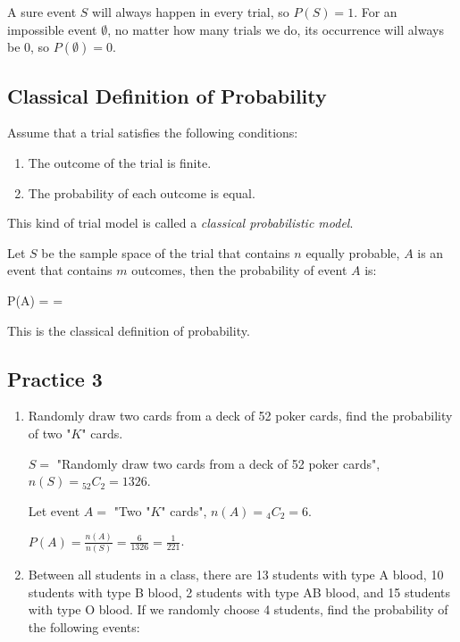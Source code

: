 \documentclass{report}
\newcommand\comb[2][^n]{{}_{#1}C_{#2}}
\begin{document}
\begin{multicols}{2}
  A sure event $S$ will always happen in every trial, so $P(S) = 1$. For an
  impossible event $\emptyset$, no matter how many trials we do, its occurrence
  will always be 0, so $P(\emptyset) = 0$.

  \subsection*{Classical Definition of Probability}

  Assume that a trial satisfies the following conditions:

  \begin{enumerate}
    \item The outcome of the trial is finite.
    \item The probability of each outcome is equal.
  \end{enumerate}

  This kind of trial model is called a \emph{classical probabilistic model}.

  Let $S$ be the sample space of the trial that contains $n$ equally probable,
  $A$ is an event that contains $m$ outcomes, then the probability of event $A$
  is:
  \begin{cequation}
    P(A) =  = 
  \end{cequation}
  This is the classical definition of probability.

  \subsection{Practice 3}

  \begin{enumerate}
    \item Randomly draw two cards from a deck of 52 poker cards, find the probability of
          two "$K$" cards. \sol{}

          $S =$ "Randomly draw two cards from a deck of 52 poker
          cards", $n(S) = \comb[52]{2} = 1326$.

          Let event $A =$ "Two "$K$" cards", $n(A) = \comb[4]{2} = 6$.

          $P(A) = \frac{n(A)}{n(S)} = \frac{6}{1326} = \frac{1}{221}$.

    \item Between all students in a class, there are 13 students with type A blood, 10
          students with type B blood, 2 students with type AB blood, and 15 students with
          type O blood. If we randomly choose 4 students, find the probability of the
          following events: \sol{}


\end{enumerate}
\end{multicols}
\end{document}

